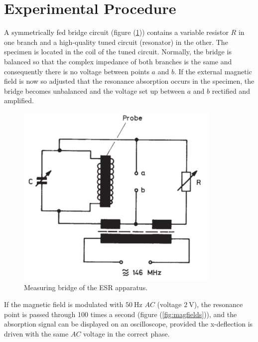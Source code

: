 \documentclass[%
 reprint,
nofootinbib,
 amsmath,amssymb,
 aps,
floatfix,
]{revtex4-2}
\begin{document}
\section{Experimental Procedure}
    A symmetrically fed bridge circuit (figure (\ref{fig:bridge})) contains a variable resistor $R$ in one branch and a high-quality tuned circuit (resonator) in the other. The specimen is located in the coil of the tuned circuit. Normally, the bridge is balanced so that the complex impedance of both branches is the same and consequently there is no voltage between points $a$ and $b$. If the external magnetic field is now so adjusted that the resonance absorption occurs in the specimen, the bridge becomes unbalanced and the voltage set up between $a$ and $b$ rectified and amplified.
    \begin{figure}
        \centering
        \includegraphics{Figures/measuringbridge.png}
        \caption{Measuring bridge of the ESR apparatus.}
        \label{fig:bridge}
    \end{figure}
    If the magnetic field is modulated with $\SI{50}{\hertz}$ $AC$ (voltage $\SI{2}{\volt}$), the resonance point is passed through 100 times a second (figure (\ref{fig:magfields})), and the absorption signal can be displayed on an oscilloscope, provided the x-deflection is driven with the same $AC$ voltage in the correct phase.
\end{document}
